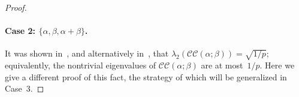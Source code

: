 \documentclass[11pt]{article}
\newcommand{\CC}[2]{\mathcal{C}\mathcal{C}(#1;#2)}
\begin{document}
\begin{proof}
    
    
    \paragraph{Case 2: $\{\alpha,\beta,\alpha+\beta\}$.}
    It was shown in~\cite{KO18}, and alternatively in~\cite[Corollary 5.6]{HS19}, that $\lambda_2(\CC{\alpha}{\beta}) = \sqrt{1/p}$; equivalently, the nontrivial eigenvalues of $\CC{\alpha}{\beta}$ are at most~$1/p$. Here we give a different proof of this fact, the strategy of which will be generalized in Case~3.
    

\end{proof}
\end{document}
